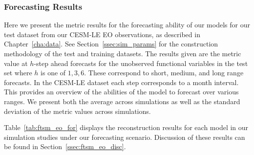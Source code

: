 \subsubsection{Forecasting Results}
Here we present the metric results for the forecasting ability of our models for our test dataset from our CESM-LE EO observations, as described in Chapter~\ref{cha:data}.
See Section~\ref{ssec:sim_params} for the construction methodology of the test and training datasets. 
The results given are the metric value at $h$-step ahead forecasts for the unobserved functional variables in the test set where $h$ is one of $1, 3, 6$. 
These correspond to short, medium, and long range forecasts.
In the CESM-LE dataset each step corresponds to a month interval.
This provides an overview of the abilities of the model to forecast over various ranges.
We present both the average across simulations as well as the standard deviation of the metric values across simulations.

Table~\ref{tab:ftsm_eo_for} displays the reconstruction results for each model in our simulation studies under our forecasting scenario. 
Discussion of these results can be found in Section~\ref{ssec:ftsm_eo_disc}.

